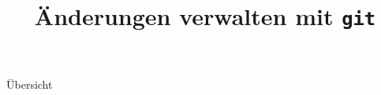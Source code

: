 

\title[\texttt{git}]{Änderungen verwalten mit \texttt{git}}



{
  \begin{frame}
    \titlepage
  \end{frame}
}

\begin{frame}{Übersicht}
  \tableofcontents
\end{frame}




